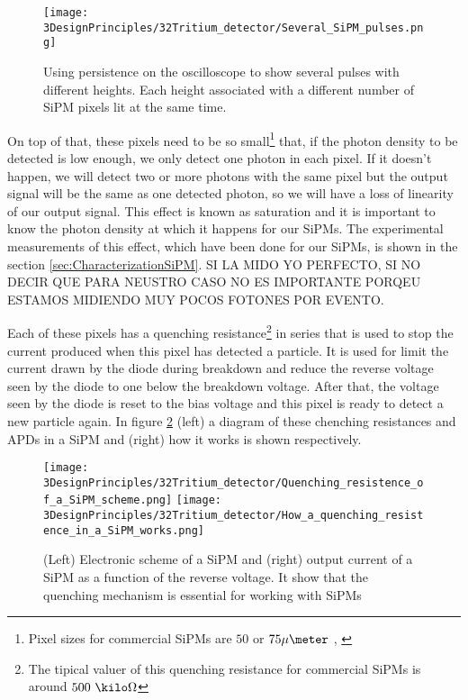 \begin{figure}[htbp]
\centering
\texttt{[image: 3DesignPrinciples/32Tritium\_detector/Several\_SiPM\_pulses.png]}
\caption{Using persistence on the oscilloscope to show several pulses with different heights. Each height associated with a different number of  SiPM pixels lit at the same time.\label{fig:PulsesOfSiPM}}
\end{figure}

On top of that, these pixels need to be so small\footnote{Pixel sizes for commercial SiPMs are $50$ or $75\mu\meter$ \cite{DataSheetHammamatsu_1_SiPM_50}, \cite{DataSheetHammamatsu_1_SiPM_75}} that, if the photon density to be detected is low enough, we only detect one photon in each pixel. If it doesn't happen, we will detect two or more photons with the same pixel but the output signal will be the same as one detected photon, so we will have a loss of linearity of our output signal. This effect is known as saturation and it is important to know the photon density at which it happens for our SiPMs. The experimental measurements of this effect, which have been done for our SiPMs, is shown in the section \ref{sec:CharacterizationSiPM}. SI LA MIDO YO PERFECTO, SI NO DECIR QUE PARA NEUSTRO CASO NO ES IMPORTANTE PORQEU ESTAMOS MIDIENDO MUY POCOS FOTONES POR EVENTO.

Each of these pixels has a quenching resistance\footnote{The tipical valuer of this quenching resistance for commercial SiPMs is around $500~\kilo\Omega$} in series that is used to stop the current produced when this pixel has detected a particle. It is used for limit the current drawn by the diode during breakdown and reduce the reverse voltage seen by the diode to one below the breakdown voltage. After that, the voltage seen by the diode is reset to the bias voltage and this pixel is ready to detect a new particle again. In figure \ref{fig:ChenchingResistance} (left) a diagram of these chenching resistances and APDs in a SiPM and (right) how it works is shown respectively.

\begin{figure}[htbp]
\centering
{
\texttt{[image: 3DesignPrinciples/32Tritium\_detector/Quenching\_resistence\_of\_a\_SiPM\_scheme.png]}
}
{
\texttt{[image: 3DesignPrinciples/32Tritium\_detector/How\_a\_quenching\_resistence\_in\_a\_SiPM\_works.png]}
}
\caption{(Left) Electronic scheme of a SiPM and (right) output current of a SiPM as a function of the reverse voltage. It show that the quenching mechanism is essential for working with SiPMs\label{fig:ChenchingResistance}~\cite{DataSheetSensL}}
\end{figure}

